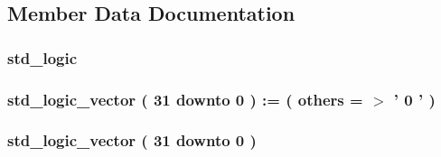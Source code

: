 \subsection{\-Member \-Data \-Documentation}
\hypertarget{class_p_c_adder__tb_1_1behavior_a5dc0e950c743b6867902097030b977b0}{
\subsubsection[{\-P\-C\-A}]{ {\bfseries  } }}\label{class_p_c_adder__tb_1_1behavior_a5dc0e950c743b6867902097030b977b0}
\hypertarget{class_p_c_adder__tb_1_1behavior_ad58a2240944eedcee02839cbcf3f871b}{
\subsubsection[{clk}]{ {\bfseries std\-\_\-logic } }}\label{class_p_c_adder__tb_1_1behavior_ad58a2240944eedcee02839cbcf3f871b}
\hypertarget{class_p_c_adder__tb_1_1behavior_a41945ec3325c2b38b7618dd164dbc2ef}{
\subsubsection[{\-P\-C}]{ {\bfseries std\-\_\-logic\-\_\-vector (   31    downto    0  )  \-:= (  others  = $>$ '  0  '  ) } }}\label{class_p_c_adder__tb_1_1behavior_a41945ec3325c2b38b7618dd164dbc2ef}
\hypertarget{class_p_c_adder__tb_1_1behavior_a6e9bc854a8af2389b8d808375c044d2f}{
\subsubsection[{\-P\-C4}]{ {\bfseries std\-\_\-logic\-\_\-vector (   31    downto    0  ) } }}\label{class_p_c_adder__tb_1_1behavior_a6e9bc854a8af2389b8d808375c044d2f}
